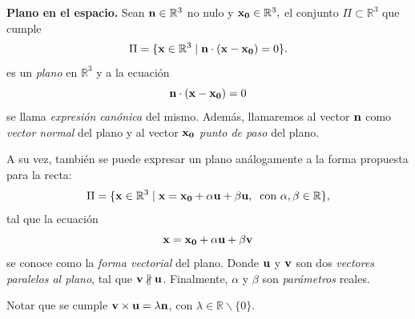 \begin{definition}{\textbf{Plano en el espacio.}}
  Sean    $\vect{n}\in\mathbb{R}^3$   no nulo  y  $\vect{x_0}\in\mathbb{R}^3,$  el conjunto $\Pi \subset \mathbb{R}^3 $  que cumple  
    \begin{equation*}
      \Pi  = \{   \vect{x} \in\mathbb{R}^3  \;|\;    \vect{n}\cdot(\vect{x} - \vect{x_0}) =0   \}.
    \end{equation*} es un \textit{plano} en $\mathbb{R}^3$  y a la ecuaci\'on   $$ \vect{n}\cdot(\vect{x} - \vect{x_0}) =0$$  se llama  \emph{expresi\'on canónica} del mismo.  Adem\'as, llamaremos al vector $\vect{n}$   como \emph{vector normal} del plano 
    y al vector  $\vect{x_0}$ \emph{punto de paso} del plano. 

    A su vez, también se puede expresar un plano análogamente a la forma propuesta para la recta:
    \begin{equation*}
      \Pi  = \{   \vect{x} \in\mathbb{R}^3  \;|\;    \vect{x}=\vect{x_0}+\alpha \vect{u} + \beta \vect{u},  \:  \mbox{  con }  \alpha,\beta\in\mathbb{R}    \},
    \end{equation*} tal que la ecuación
    \begin{equation*}
       \vect{x}=\vect{x_0}+\alpha \vect{u} + \beta \vect{v}
    \end{equation*}
    se conoce como la \emph{forma vectorial} del plano. Donde $\vect{u}$ y $\vect{v}$ son dos \emph{vectores paralelos al plano}, tal que  $\vect{v}\nparallel\vect{u}$.
    Finalmente, $\alpha$ y $\beta$ son \emph{parámetros} reales.
    \label{def:planoR3}
 \end{definition}

 \begin{obs}
    Notar que se cumple $\vect{v}\times\vect{u}=\lambda\vect{n}$, con $\lambda\in\mathbb{R}\smallsetminus\{0\}$.
 \end{obs}
   
